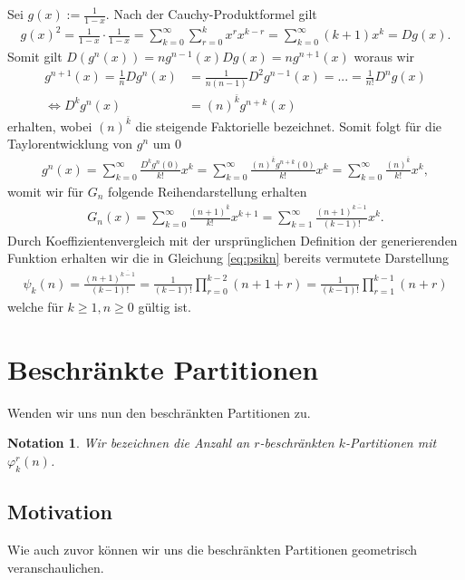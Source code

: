 \documentclass{article}
\newtheorem{notation}{Notation}
\begin{document}
Sei $g(x) := \frac{1}{1-x}$. Nach der Cauchy-Produktformel gilt
\begin{align*}
    g(x)^2 = \frac{1}{1-x} \cdot \frac{1}{1-x} = \sum_{k=0}^\infty \sum_{r=0}^k x^r x^{k-r} = \sum_{k=0}^\infty (k+1)x^k = Dg(x).
\end{align*}
Somit gilt $D(g^n(x)) = ng^{n-1}(x) Dg(x) = ng^{n+1}(x)$ woraus wir
\begin{align*}
    g^{n+1}(x)      = \frac{1}{n} D g^n(x) & = \frac{1}{n(n-1)} D^2 g^{n-1}(x) = ... = \frac{1}{n!} D^n g(x) \\
    \iff D^k g^n(x)                        & = (n)^{\bar{k}} g^{n+k}(x)
\end{align*}
erhalten, wobei $(n)^{\bar{k}}$ die steigende Faktorielle bezeichnet. Somit folgt für die Taylorentwicklung von $g^n$ um $0$
\begin{align*}
    g^n(x) = \sum_{k=0}^\infty \frac{D^k g^n(0)}{k!} x^k = \sum_{k=0}^\infty \frac{(n)^{\bar{k}} g^{n+k}(0)}{k!} x^k = \sum_{k=0}^\infty \frac{(n)^{\bar{k}}}{k!} x^k,
\end{align*}
womit wir für $G_n$ folgende Reihendarstellung erhalten
\begin{align*}
    G_n(x) = \sum_{k=0}^\infty \frac{(n+1)^{\bar{k}}}{k!} x^{k+1} = \sum_{k=1}^\infty \frac{(n+1)^{\overline{k-1}}}{(k-1)!} x^k.
\end{align*}
Durch Koeffizientenvergleich mit der ursprünglichen Definition der generierenden Funktion erhalten wir die in Gleichung \ref{eq:psikn} bereits vermutete Darstellung
\begin{align}
    \psi_k(n) = \frac{(n+1)^{\overline{k-1}}}{(k-1)!} = \frac{1}{(k-1)!} \prod_{r=0}^{k-2} (n+1+r) = \frac{1}{(k-1)!} \prod_{r=1}^{k-1} (n+r) \label{eq:psiknclosed}
\end{align}
welche für $k \geq 1, n \geq 0$ gültig ist.

\section{Beschränkte Partitionen}

Wenden wir uns nun den beschränkten Partitionen zu.
\begin{notation}
    Wir bezeichnen die Anzahl an $r$-beschränkten $k$-Partitionen mit $\varphi_k^r(n)$.
\end{notation}

\subsection{Motivation}
Wie auch zuvor können wir uns die beschränkten Partitionen geometrisch veranschaulichen.
\end{document}
